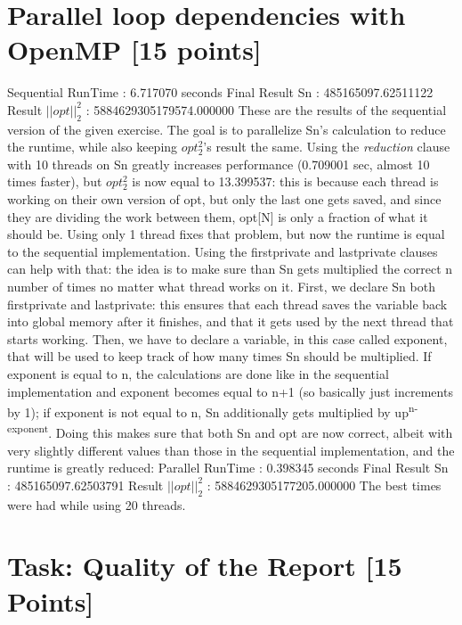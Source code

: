 \documentclass[unicode,11pt,a4paper,oneside,numbers=endperiod,openany]{scrartcl}
\begin{document}
\section{Parallel loop dependencies with OpenMP [15 points]}

Sequential RunTime :  6.717070 seconds
\newline
Final Result Sn    :  485165097.62511122
\newline
Result $||opt||^2_2$ :  5884629305179574.000000
\newline
\newline
These are the results of the sequential version of the given exercise. The goal is to parallelize Sn's calculation to reduce the runtime, while also keeping $opt^2_2$'s result the same.
\newline
Using the \textit{reduction} clause with 10 threads on Sn greatly increases performance (0.709001 sec, almost 10 times faster), but $opt^2_2$ is now equal to 13.399537: this is because each thread is working on their own version of opt, but only the last one gets saved, and since they are dividing the work between them, opt[N] is only a fraction of what it should be. Using only 1 thread fixes that problem, but now the runtime is equal to the sequential implementation.
\newline
\newline
Using the firstprivate and lastprivate clauses can help with that: the idea is to make sure than Sn gets multiplied the correct n number of times no matter what thread works on it. First, we declare Sn both firstprivate and lastprivate: this ensures that each thread saves the variable back into global memory after it finishes, and that it gets used by the next thread that starts working. Then, we have to declare a variable, in this case called exponent, that will be used to keep track of how many times Sn should be multiplied.
If exponent is equal to n, the calculations are done like in the sequential implementation and exponent becomes equal to n+1 (so basically just increments by 1); if exponent is not equal to n, Sn additionally gets multiplied by up\textsuperscript{n-exponent}.  Doing this makes sure that both Sn and opt are now correct, albeit with very slightly different values than those in the sequential implementation, and the runtime is greatly reduced:
\newline
\newline
Parallel RunTime   :  0.398345 seconds
\newline
Final Result Sn    :  485165097.62503791
\newline
Result $||opt||^2_2$ :  5884629305177205.000000
\newline
\newline
The best times were had while using 20 threads.


\section{Task:  Quality of the Report [15 Points]}
\end{document}
